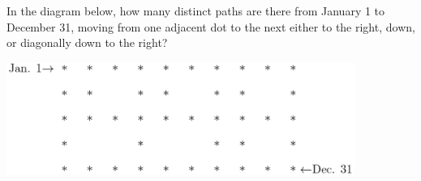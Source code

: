 In the diagram below, how many distinct paths are there from January 1 to December 31, moving from one adjacent dot to the next either to the right, down, or diagonally down to the right?

\begin{center}
\includegraphics[width = 113.60000000000001mm]{img/fig0.png}
\end{center}